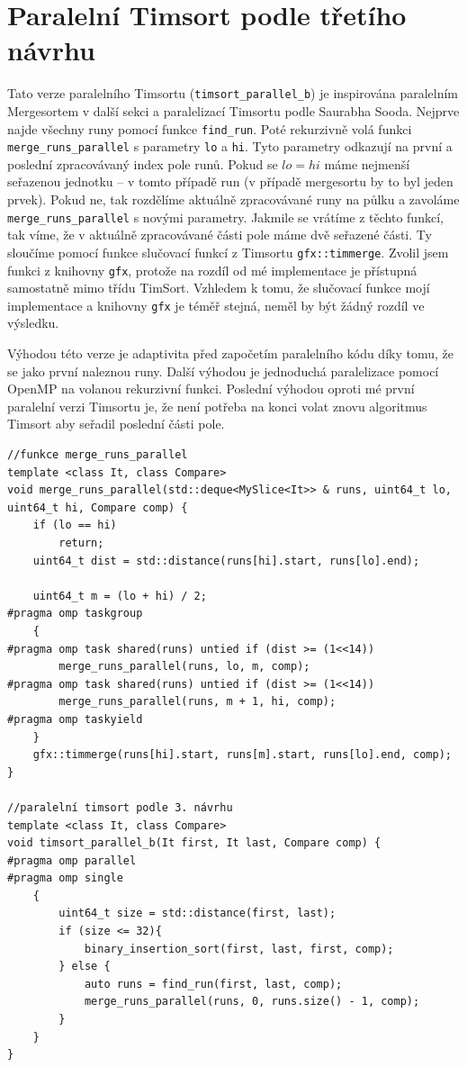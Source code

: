 \documentclass[thesis=B,czech]{FITthesis}[2019/12/23]
\begin{document}
\section{Paralelní Timsort podle třetího návrhu}
Tato verze paralelního Timsortu (\texttt{timsort\_parallel\_b}) je inspirována paralelním Mergesortem v další sekci a paralelizací Timsortu podle Saurabha Sooda. Nejprve najde všechny runy pomocí funkce \texttt{find\_run}. Poté rekurzivně volá funkci \texttt{merge\_runs\_parallel} s parametry \texttt{lo} a \texttt{hi}. Tyto parametry odkazují na první a poslední zpracovávaný index pole runů. Pokud se $ lo = hi $ máme nejmenší seřazenou jednotku -- v tomto případě run (v případě mergesortu by to byl jeden prvek). Pokud ne, tak rozdělíme aktuálně zpracovávané runy na půlku a zavoláme \texttt{merge\_runs\_parallel} s novými parametry. Jakmile se vrátíme z těchto funkcí, tak víme, že v aktuálně zpracovávané části pole máme dvě seřazené části. Ty sloučíme pomocí funkce slučovací funkcí z Timsortu \texttt{gfx::timmerge}. Zvolil jsem funkci z knihovny \texttt{gfx}, protože na rozdíl od mé implementace je přístupná samostatně mimo třídu TimSort. Vzhledem k tomu, že slučovací funkce mojí implementace a knihovny \texttt{gfx} je téměř stejná, neměl by být žádný rozdíl ve výsledku.

Výhodou této verze je adaptivita před započetím paralelního kódu díky tomu, že se jako první naleznou runy. Další výhodou je jednoduchá paralelizace pomocí OpenMP na volanou rekurzivní funkci. Poslední výhodou oproti mé první paralelní verzi Timsortu je, že není potřeba na konci volat znovu algoritmus Timsort aby seřadil poslední části pole.


\begin{verbatim}
//funkce merge_runs_parallel
template <class It, class Compare>
void merge_runs_parallel(std::deque<MySlice<It>> & runs, uint64_t lo, uint64_t hi, Compare comp) {
    if (lo == hi)
        return;
    uint64_t dist = std::distance(runs[hi].start, runs[lo].end);

    uint64_t m = (lo + hi) / 2;
#pragma omp taskgroup
    {
#pragma omp task shared(runs) untied if (dist >= (1<<14))
        merge_runs_parallel(runs, lo, m, comp);
#pragma omp task shared(runs) untied if (dist >= (1<<14))
        merge_runs_parallel(runs, m + 1, hi, comp);
#pragma omp taskyield
    }
    gfx::timmerge(runs[hi].start, runs[m].start, runs[lo].end, comp);
}

//paralelní timsort podle 3. návrhu
template <class It, class Compare>
void timsort_parallel_b(It first, It last, Compare comp) {
#pragma omp parallel
#pragma omp single
    {
        uint64_t size = std::distance(first, last);
        if (size <= 32){
            binary_insertion_sort(first, last, first, comp);
        } else {
            auto runs = find_run(first, last, comp);
            merge_runs_parallel(runs, 0, runs.size() - 1, comp);
        }
    }
}

\end{verbatim}
\end{document}
